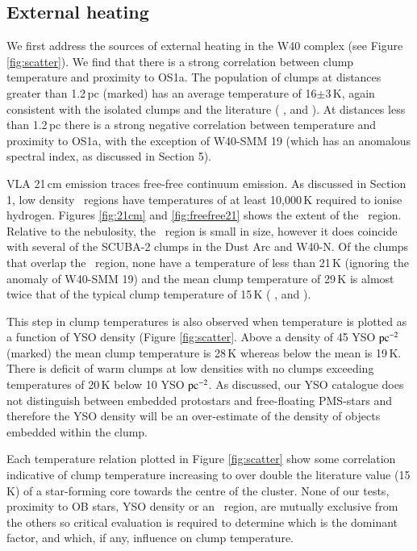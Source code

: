 \subsection{External heating}

We first address the sources of external heating in the W40 complex (see Figure \ref{fig:scatter}). 
We find that there is a strong correlation between clump temperature and proximity to OS1a. 
The population of clumps at distances greater than 1.2\,pc (marked) has an average temperature 
of 16$\pm$3\,K, again consistent with the isolated clumps and the literature (\citeauthor{Johnstone:2000fk} 
\citeyear{Johnstone:2000fk}, \citeauthor{Kirk:2006vn} \citeyear{Kirk:2006vn} and \citeauthor{Rumble:2015vn} 
\citeyear{Rumble:2015vn}). At distances less than 1.2\,pc there is a strong negative correlation 
between temperature and proximity to OS1a, with the exception of W40-SMM 19 (which has an 
anomalous spectral index, as discussed in Section 5).

VLA 21\,cm emission traces free-free continuum emission. As discussed in Section 1, low density 
\HII\ regions have temperatures of at least 10,000\,K required to ionise hydrogen. Figures \ref{fig:21cm} 
and \ref{fig:freefree21} shows the extent of the \HII\ region. Relative to the nebulosity, the \HII\ 
region is small in size, however it does coincide with several of the SCUBA-2 clumps in the Dust 
Arc and W40-N. Of the clumps that overlap the \HII\ region, none have a temperature of less than 
21\,K (ignoring the anomaly of W40-SMM 19) and the mean clump temperature of 29\,K is almost 
twice that of the typical clump temperature of 15\,K (\citeauthor{Johnstone:2000fk} \citeyear{Johnstone:2000fk}, 
\citeauthor{Kirk:2006vn} \citeyear{Kirk:2006vn} and \citeauthor{Rumble:2015vn} \citeyear{Rumble:2015vn}).

This step in clump temperatures is also observed when temperature is plotted as a function of 
YSO density (Figure \ref{fig:scatter}. Above a density of 45 YSO$\hbox{ pc$^{-2}$}$ (marked) the 
mean clump temperature is 28\,K whereas below the mean is 19\,K. There is deficit of warm 
clumps at low densities with no clumps exceeding temperatures of 20\,K below 10 YSO$\hbox{ 
pc$^{-2}$}$. As discussed, our YSO catalogue does not distinguish between embedded protostars 
and free-floating PMS-stars and therefore the YSO density will be an over-estimate of the density of 
objects embedded within the clump.

Each temperature relation plotted in Figure \ref{fig:scatter} show some correlation indicative of 
clump temperature increasing to over double the literature value (15\,K) of a star-forming core 
towards the centre of the cluster. None of our tests, proximity to OB stars, YSO density 
or an \HII\ region, are mutually exclusive from the others so critical evaluation is required to 
determine which is the dominant factor, and which, if any, influence on clump temperature. 

